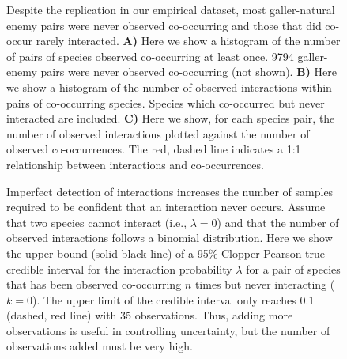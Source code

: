 \documentclass[12pt]{article}
\begin{document}
  \begin{figure}[h!]
      \caption{Despite the replication in our empirical dataset, most galler-natural enemy pairs were never observed co-occurring and those that did co-occur rarely interacted. \textbf{A)} Here we show a histogram of the number of pairs of species observed co-occurring at least once. 9794 galler-enemy pairs were never observed co-occurring (not shown).
      \textbf{B)} Here we show a histogram of the number of observed interactions within pairs of co-occurring species. Species which co-occurred but never interacted are included. 
      \textbf{C)} Here we show, for each species pair, the number of observed interactions plotted against the number of observed co-occurrences. The red, dashed line indicates a 1:1 relationship between interactions and co-occurrences.}
      \label{histograms}
      \begin{center}
      \end{center}
      \end{figure}


  \begin{figure}[h!]
    \caption{Imperfect detection of interactions increases the number of samples required to be confident that an interaction never occurs. Assume that two species cannot interact (i.e., $\lambda=0$) and that the number of observed interactions follows a binomial distribution. Here we show the upper bound (solid black line) of a 95\% Clopper-Pearson true credible interval for the interaction probability $\lambda$ for a pair of species that has been observed co-occurring $n$ times but never interacting ($k = 0$). The upper limit of the credible interval only reaches 0.1 (dashed, red line) with 35 observations. Thus, adding more observations is useful in controlling uncertainty, but the number of observations added must be very high. }
    \label{upper_limits}
    \begin{center}
    \end{center}
    \end{figure}
\end{document}
